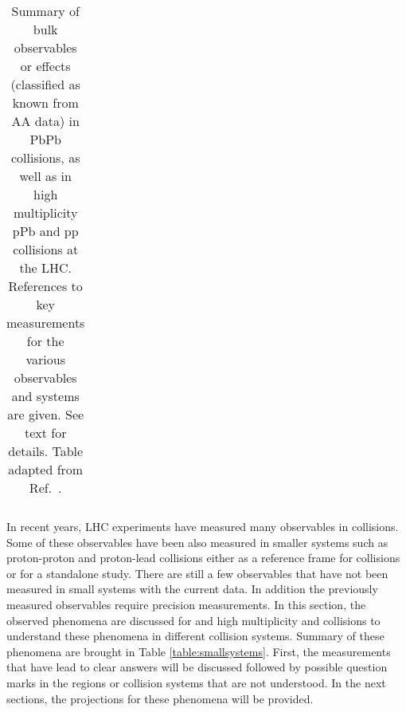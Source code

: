 \documentclass[../report.tex]{subfiles}
\begin{document}
{\begin{landscape}
\begin{table}[h!]
\begin{center}
\begin{tabular}{p{5cm}|p{3.6cm}|p{3.6cm}|p{3.6cm}| p{3cm} }
   \hline
    \hline
  \end{tabular}
  \caption{Summary of bulk observables or effects (classified as known from AA data) in PbPb collisions, as well as in high multiplicity pPb and pp collisions at the LHC. References to key measurements for the various observables and systems are given. See text for details. Table adapted from Ref.~\cite{Loizides:2016tew}.}
\end{center}  
\end{table}
\end{landscape}
}



In recent years, LHC experiments have measured many observables in \PbPb{} collisions. Some of these observables have been also measured in smaller systems such as proton-proton and proton-lead collisions either as a reference frame for \PbPb{} collisions or for a standalone study. There are still a few observables that have not been measured in small systems with the current data. In addition the previously measured observables require precision measurements. In this section, the observed phenomena are discussed for \PbPb{} and high multiplicity \pPb{} and \pp{} collisions to understand these phenomena in different collision systems. Summary of these phenomena are brought in Table \ref{table:smallsystems}. First, the measurements that have lead to clear answers will be discussed followed by possible question marks in the regions or collision systems that are not understood. In the next sections, the projections for these phenomena will be provided. 
\end{document}
